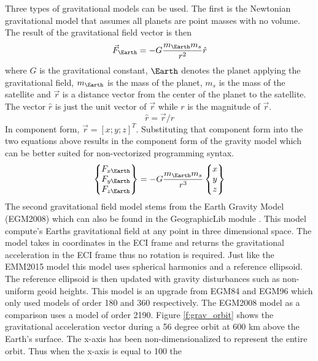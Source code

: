 Three types of gravitational models can be used. The first is the
Newtonian gravitational model that assumes all planets are point
masses with no volume. The result of the gravitational field vector is
then
\begin{equation}
  \vec{F}_{\Earth} = -G\frac{m_{\Earth} m_s}{r^2}\hat{r}
\end{equation}
where $G$ is the gravitational constant, $\Earth$ denotes the planet
applying the gravitational field, $m_\Earth$ is the mass of the
planet, $m_s$ is the mass of the satellite and $\vec{r}$ is a distance
vector from the center of the planet to the satellite. The vector
$\hat{r}$ is just the unit vector of $\vec{r}$ while $r$ is the
magnitude of $\vec{r}$.
\begin{equation}
  \hat{r} = \vec{r}/r
\end{equation}
In component form, $\vec{r} = [x;y;z]^T$. Substituting that component
form into the two equations above results in the component form of the
gravity model which can be better suited for non-vectorized
programming syntax.
\begin{equation}
\begin{Bmatrix}F_{x\Earth}\\F_{y\Earth}\\F_{z\Earth}\end{Bmatrix} = -G\frac{m_{\Earth}
  m_s}{r^3}\begin{Bmatrix}x\\y\\z\end{Bmatrix}
\end{equation}
The second gravitational field model stems from the
Earth Gravity Model (EGM2008) \cite{EGM2008} which can also be found
in the GeographicLib module \cite{GeographicLib}. This model compute's
Earths gravitational field at any point in three dimensional
space. The model takes in coordinates in the ECI frame and returns the
gravitational acceleration in the ECI frame thus no rotation is
required. Just like the EMM2015 model this model uses spherical
harmonics and a reference ellipsoid. The reference ellipsoid is then
updated with gravity disturbances such as non-uniform geoid
heights. This model is an upgrade from EGM84 and EGM96 which only
used models of order 180 and 360 respectively. The EGM2008 model as a
comparison uses a model of order 2190. Figure \ref{f:grav_orbit} shows
the gravitational acceleration vector during a 56 degree orbit at 600 km above the
Earth's surface. The x-axis has been non-dimensionalized to 
represent the entire orbit. Thus when the x-axis is equal to 100 the
